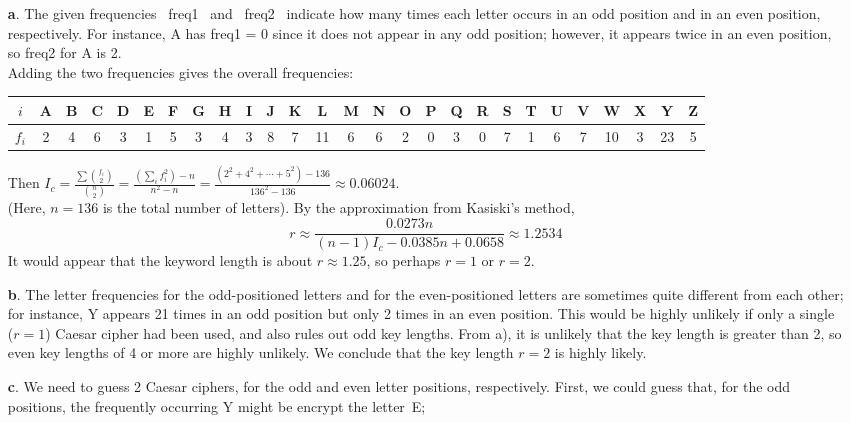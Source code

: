\documentclass[11pt]{article}
\begin{document}
\bigskip{}
\begin{itemize}
  \item[{\bf a}.]
    The given frequencies \, freq1 \, and \, freq2 \, indicate how many times
    each letter occurs in an odd position and in an even position, respectively.
    For instance, A has freq1 = 0 since it does not appear in any odd position;
    however, it appears twice in an even position, so freq2 for A is 2.\\
    Adding the two frequencies gives the overall frequencies:
    \begin{center}
    {\setlength{\tabcolsep}{3pt}
      \begin{tabular}{|c|cccccccccccccccccccccccccc|}\hline
        $i$   & A & B & C & D & E & F & G & H & I & J & K &  L & M & N & O & P & Q & R & S & T & U & V &  W & X &  Y & Z\\\hline
        $f_i$ & 2 & 4 & 6 & 3 & 1 & 5 & 3 & 4 & 3 & 8 & 7 & 11 & 6 & 6 & 2 & 0 & 3 & 0 & 7 & 1 & 6 & 7 & 10 & 3 & 23 & 5\\\hline
      \end{tabular}}
    \end{center}
    Then $\displaystyle I_c = \frac{\sum\binom{f_i}{2}}{\binom{n}{2}} = \frac{(\sum_{i}f_i^2) - n}{n^2 - n}
      = \frac{(2^2 + 4^2 + \cdots + 5^2) - 136}{136^2 - 136}
      \approx 0.06024$.
    \\(Here, $n = 136$ is the total number of letters).
    By the approximation from Kasiski's method,
    \[
      r\approx\frac{0.0273n}{(n-1)I_c - 0.0385n + 0.0658}
       \approx 1.2534
    \]
    It would appear that the keyword length is about $r \approx 1.25$, so perhaps $r = 1$ or $r = 2$.
  \item[{\bf b}.]
    The letter frequencies for the odd-positioned letters and for the even-positioned letters
    are sometimes quite different from each other;
    for instance, Y appears 21 times in an odd position but only 2 times in an even position.
    This would be highly unlikely if only a single ($r = 1$) Caesar cipher had been used,
    and also rules out odd key lengths.
    From a), it is unlikely that the key length is greater than 2,
    so even key lengths of 4 or more are highly unlikely.
    We conclude that the key length $r = 2$ is highly likely.
  \item[{\bf c}.]
    We need to guess 2 Caesar ciphers, for the odd and even letter positions, respectively.
    First, we could guess that, for the odd positions,
    the frequently occurring Y might be encrypt the letter~E;

\end{itemize}
\end{document}
